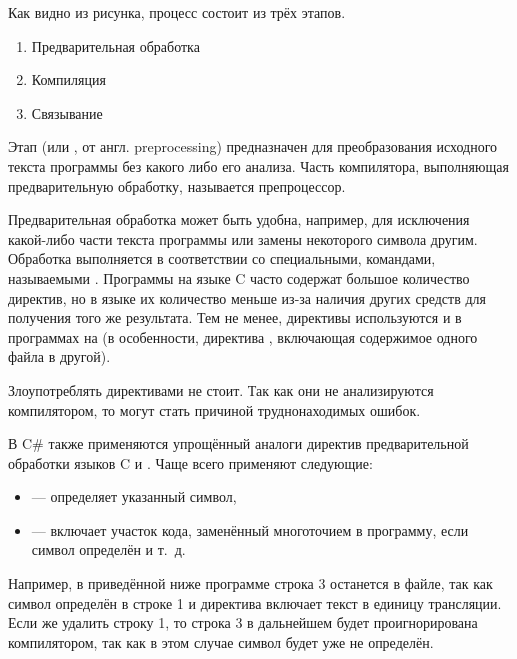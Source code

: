 Как видно из рисунка, процесс состоит из трёх этапов.

\begin{enumerate}
\item Предварительная обработка
\item Компиляция
\item Связывание
\end{enumerate}

Этап  (или
, от англ. preprocessing)
предназначен для преобразования исходного текста программы без какого
либо его анализа. Часть компилятора, выполняющая предварительную
обработку, называется препроцессор.

Предварительная обработка может быть удобна, например, для исключения
какой-либо части текста программы или замены некоторого символа
другим.  Обработка выполняется в соответствии со специальными,
командами, называемыми . Программы на языке C часто содержат большое
количество директив, но в языке \CPP их количество меньше из-за наличия
других средств для получения того же результата. Тем не менее,
директивы используются и в программах на \CPP (в особенности, директива
, включающая содержимое одного файла в другой).

Злоупотреблять директивами не стоит. Так как они не анализируются
компилятором, то могут стать причиной труднонаходимых ошибок.


В C\# также применяются упрощённый аналоги директив предварительной
обработки языков C и \CPP. Чаще всего применяют следующие:

\begin{itemize}
\item {} — определяет указанный
  символ,
\item {} —
  включает участок кода, заменённый многоточием в программу, если
  символ определён и т.~д.
\end{itemize}

Например, в приведённой ниже программе строка 3 останется в файле, так
как символ  определён в строке 1 и директива
 включает текст в единицу трансляции. Если же удалить
строку 1, то строка 3 в дальнейшем будет проигнорирована компилятором,
так как в этом случае символ  будет уже не определён.


